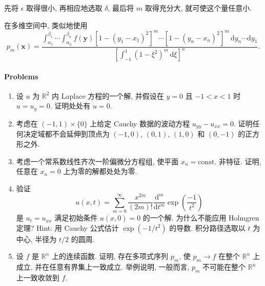 \begin{Proof}
先将 $\epsilon$ 取得很小, 再相应地选取 $\delta$, 最后将 $m$ 取得充分大, 就可使这个量任意小.

在多维空间中, 类似地使用
\begin{equation}\label{eq:weierstrass-multivariable-polynomial}
p_m(\bm{x})=\dfrac{\int_{\alpha_1}^{\beta_1}\cdots\int_{\alpha_n}^{\beta_n}f(\bm{y})[1-(y_1-x_1)^2]^m\cdots[1-(y_n-x_n)^2]^m\,\mathrm{d}y_n\cdots\mathrm{d}y_1}{\left[\int_{-1}^1(1-\xi^2)^m\,\mathrm{d}\xi\right]^n}.
\end{equation}
\end{Proof}

\paragraph*{Problems}

\begin{enumerate}[label=\thesection.\arabic*.,ref=\thesection.\arabic*,start=18,series=book-problems]

\item\label{ex:laplace-cauchy-uniqueness} 设 $u$ 为 $\mathbb{R}^2$ 内 Laplace 方程的一个解, 并假设在 $y=0$ 且 $-1<x<1$ 时 $u=u_y=0$. 证明处处有 $u=0$.

\item\label{ex:wave-determinacy-boundary} 考虑在 $(-1,1)\times\{0\}$ 上给定 Cauchy 数据的波动方程 $u_{yy}-u_{xx}=0$. 证明任何决定域都不会延伸到顶点为 $(-1,0)$, $(0,1)$, $(1,0)$ 和 $(0,-1)$ 的正方形之外.

\item\label{ex:constant-coefficient-cauchy-uniqueness} 考虑一个常系数线性齐次一阶偏微分方程组, 使平面 $x_n=\mathrm{const.}$ 非特征. 证明, 任意在 $x_n=0$ 上为零的解都处处为零.

\item\label{ex:nonunique-zero-initial-heat-solution} 验证
\begin{equation}\label{eq:flat-in-time-heat-series}
u(x,t)=\sum_{m=0}^{\infty}\dfrac{x^{2m}}{(2m)!}\dfrac{\mathrm{d}^m}{\mathrm{d}t^m}\exp\left(\dfrac{-1}{t^2}\right)
\end{equation}
是 $u_t=u_{xx}$ 满足初始条件 $u(x,0)=0$ 的一个解. 为什么不能应用 Holmgren 定理? Hint: 用 Cauchy 公式估计 $\exp(-1/t^2)$ 的导数. 积分路径选取以 $t$ 为中心, 半径为 $t/2$ 的圆周.

\item\label{ex:polynomial-approximation-on-bounded-sets} 设 $f$ 是 $\mathbb{R}^n$ 上的连续函数. 证明, 存在多项式序列 $p_m$, 使 $p_m\to f$ 在整个 $\mathbb{R}^n$ 上成立, 并在任意有界集上一致成立. 举例说明, 一般而言, $p_m$ 不可能在整个 $\mathbb{R}^n$ 上一致收敛到 $f$.

\end{enumerate}

